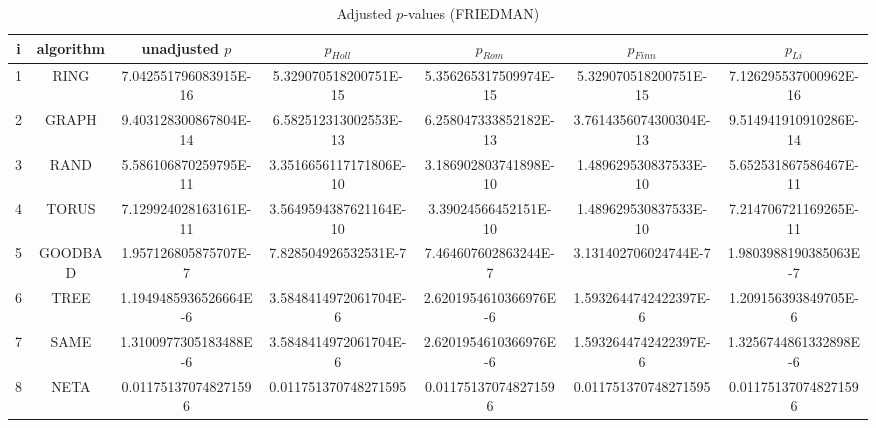 \documentclass[a4paper,10pt]{article}
\begin{document}
\begin{landscape}
\begin{table}[!htp]
\centering\scriptsize
\caption{Adjusted $p$-values (FRIEDMAN)}
\begin{tabular}{ccccccc}
i&algorithm&unadjusted $p$&$p_{Holl}$&$p_{Rom}$&$p_{Finn}$&$p_{Li}$\\
\hline
1& RING&7.042551796083915E-16&5.329070518200751E-15&5.356265317509974E-15&5.329070518200751E-15&7.126295537000962E-16\\
2& GRAPH&9.403128300867804E-14&6.582512313002553E-13&6.258047333852182E-13&3.7614356074300304E-13&9.514941910910286E-14\\
3& RAND&5.586106870259795E-11&3.3516656117171806E-10&3.186902803741898E-10&1.489629530837533E-10&5.652531867586467E-11\\
4& TORUS&7.129924028163161E-11&3.5649594387621164E-10&3.39024566452151E-10&1.489629530837533E-10&7.214706721169265E-11\\
5& GOODBAD&1.957126805875707E-7&7.828504926532531E-7&7.464607602863244E-7&3.131402706024744E-7&1.9803988190385063E-7\\
6& TREE&1.1949485936526664E-6&3.5848414972061704E-6&2.6201954610366976E-6&1.5932644742422397E-6&1.209156393849705E-6\\
7& SAME&1.3100977305183488E-6&3.5848414972061704E-6&2.6201954610366976E-6&1.5932644742422397E-6&1.3256744861332898E-6\\
8& NETA&0.011751370748271596&0.011751370748271595&0.011751370748271596&0.011751370748271595&0.011751370748271596\\
\hline
\end{tabular}
\end{table}


\newpage


\end{landscape}
\end{document}
